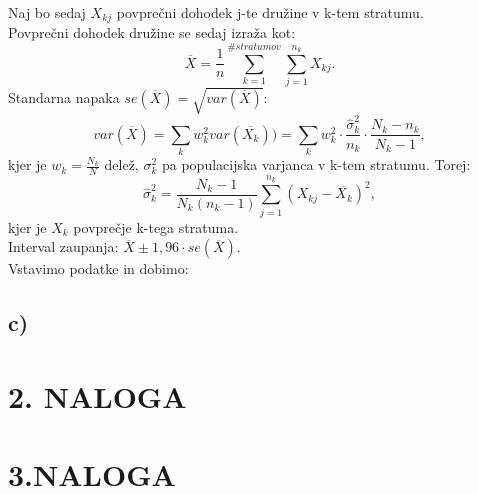 \documentclass{article}
\begin{document}
Naj bo sedaj $X_{kj}$ povprečni dohodek j-te družine v k-tem stratumu.\\
Povprečni dohodek družine se sedaj izraža kot:
\begin{equation*}
\overline{X} = \frac{1}{n} \sum_{k=1}^{\# stratumov} \sum_{j=1}^{n_k} X_{kj}.
\end{equation*}
Standarna napaka $se(\overline{X}) = \sqrt{var( \overline{X})}$:
\begin{equation*}
var(\overline{X}) = \sum_k w_k^2 var(\overline{X_k}))  = \sum_k w_k^2 \cdot \frac{\hat{\sigma}_k^2}{n_k} \cdot \frac{N_k-n_k}{N_k-1},
\end{equation*}
kjer je $w_k = \frac{N_k}{N}$ delež, $\sigma_k^2$ pa populacijska varjanca v k-tem stratumu. Torej:
\begin{equation*}
\hat{\sigma}_k^2 = \frac{N_k-1}{N_k(n_k-1)} \sum_{j=1}^{n_k} (X_{kj}-\overline{X_k})^2,
\end{equation*}
kjer je $X_k$ povprečje k-tega stratuma.\\
Interval zaupanja: $\overline{X} \pm 1,96 \cdot se(\overline{X})$. \\
Vstavimo podatke in dobimo:


\subsection*{c)}

\section*{2. NALOGA}

\section*{3.NALOGA}
\end{document}

